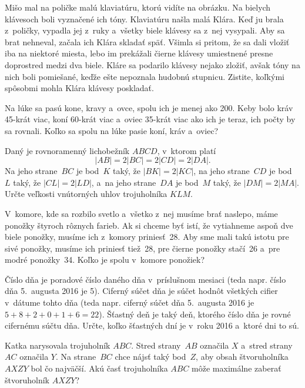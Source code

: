 {%
Mišo mal na poličke malú klaviatúru, ktorú vidíte na obrázku.
Na bielych klávesoch boli vyznačené ich tóny.
%
Klaviatúru našla malá Klára.
Keď ju brala z~poličky, vypadla jej z~ruky a~všetky biele klávesy sa z~nej vysypali.
Aby sa brat nehneval, začala ich Klára skladať späť.
Všimla si pritom, že sa dali vložiť iba na niektoré miesta, lebo im prekážali čierne klávesy umiestnené presne doprostred medzi dva biele.
Kláre sa podarilo klávesy nejako zložiť, avšak tóny na nich boli pomiešané,
keďže ešte nepoznala hudobnú stupnicu.
Zistite, koľkými spôsobmi mohla Klára klávesy poskladať.
}

{%
Na lúke sa pasú kone, kravy a~ovce, spolu ich je menej ako 200.
Keby bolo kráv 45-krát viac, koní 60-krát viac a~oviec 35-krát viac ako ich je teraz, ich počty by sa rovnali.
Koľko sa spolu na lúke pasie koní, kráv a~oviec?
}

{%
Daný je rovnoramenný lichobežník $ABCD$, v~ktorom platí
$$
|AB|=2|BC|=2|CD|=2|DA|.
$$
Na jeho strane~$BC$ je bod~$K$ taký, že $|BK|=2|KC|$, na jeho strane~$CD$
je bod~$L$ taký, že $|CL|=2|LD|$, a~na jeho strane~$DA$ je bod~$M$ taký,
že $|DM|=2|MA|$.
Určte veľkosti vnútorných uhlov trojuholníka $KLM$.
}

{%
V~komore, kde sa rozbilo svetlo a~všetko z~nej musíme brať naslepo, máme ponožky štyroch rôznych farieb.
Ak si chceme byť istí, že vytiahneme aspoň dve biele ponožky, musíme ich z~komory priniesť~28.
Aby sme mali takú istotu pre sivé ponožky, musíme ich priniesť tiež~28,
pre čierne ponožky stačí~26 a~pre modré ponožky~34.
Koľko je spolu v~komore ponožiek?
}

{%
Číslo dňa je poradové číslo daného dňa v~príslušnom mesiaci (teda napr. číslo dňa 5.~augusta 2016 je 5).
Ciferný súčet dňa je súčet hodnôt všetkých cifier v~dátume tohto dňa (teda
napr. ciferný súčet dňa 5.~augusta 2016 je $5+8+2+0+1+6=22$).
Šťastný deň je taký deň, ktorého číslo dňa je rovné cifernému súčtu dňa.
Určte, koľko šťastných dní je v~roku 2016 a~ktoré dni to sú.
}

{%
Katka narysovala trojuholník $ABC$.
Stred strany~$AB$ označila $X$ a~stred strany~$AC$ označila $Y$.
Na strane~$BC$ chce nájsť taký bod~$Z$, aby obsah štvoruholníka $AXZY$ bol čo najväčší.
Akú časť trojuholníka $ABC$ môže maximálne zaberať štvoruholník $AXZY$?
}


